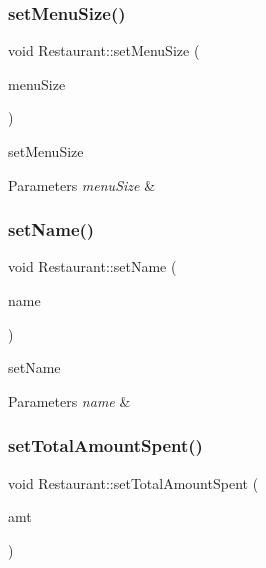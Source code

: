 \subsubsection{\texorpdfstring{set\+Menu\+Size()}{setMenuSize()}}
{\footnotesize\ttfamily void Restaurant\+::set\+Menu\+Size (\begin{DoxyParamCaption}\item[{int}]{menu\+Size }\end{DoxyParamCaption})}



set\+Menu\+Size 


\begin{DoxyParams}{Parameters}
{\em menu\+Size} & \\
\hline
\end{DoxyParams}
\mbox{\label{class_restaurant_aec426da0e4c067525fdd1d233c32a5f3}} 
\subsubsection{\texorpdfstring{set\+Name()}{setName()}}
{\footnotesize\ttfamily void Restaurant\+::set\+Name (\begin{DoxyParamCaption}\item[{Q\+String}]{name }\end{DoxyParamCaption})}



set\+Name 


\begin{DoxyParams}{Parameters}
{\em name} & \\
\hline
\end{DoxyParams}
\mbox{\label{class_restaurant_a084b4300b60a5d76cbdcbe01724ba5a6}} 
\subsubsection{\texorpdfstring{set\+Total\+Amount\+Spent()}{setTotalAmountSpent()}}
{\footnotesize\ttfamily void Restaurant\+::set\+Total\+Amount\+Spent (\begin{DoxyParamCaption}\item[{double}]{amt }\end{DoxyParamCaption})}



